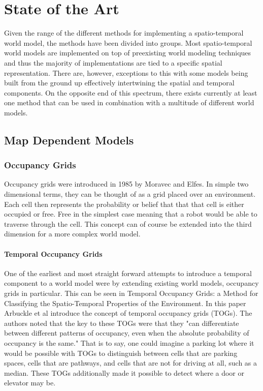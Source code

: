 
\chapter{ State of the Art }

Given the range of the different methods for implementing a spatio-temporal
world model, the methods have been divided into groups.  Most spatio-temporal
world models are implemented on top of preexisting world modeling techniques
and thus the majority of implementations are tied to a specific spatial
representation. There are, however, exceptions to this with some models being
built from the ground up effectively intertwining the spatial and temporal
components. On the opposite end of this spectrum, there exists currently at
least one method that can be used in combination with a multitude of different
world models.


\section{ Map Dependent Models }

\subsection{ Occupancy Grids }

Occupancy grids were introduced in 1985 by Moravec and Elfes. \cite{Elfes1985}
In simple two dimensional terms, they can be thought of as a grid placed
over an environment. Each cell then represents the probability or belief that
that that cell is either occupied or free. Free in the simplest case meaning
that a robot would be able to traverse through the cell. This concept can of
course be extended into the third dimension for a more complex world model. \\

\subsubsection{ Temporal Occupancy Grids }
One of the earliest and most straight forward attempts to introduce a temporal
component to a world model were by extending existing world models, occupancy
grids in particular. This can be seen in Temporal Occupancy Grids: a Method for
Classifying the Spatio-Temporal Properties of the Environment.
\cite{Arbuckle2002} In this paper Arbuckle et al introduce the concept of
temporal occupancy grids (TOGs). The authors noted that the key to these TOGs
were that they "can differentiate between different patterns of occupancy, even
when the absolute probability of occupancy is the same." That is to say, one
could imagine a parking lot where it would be possible with TOGs to distinguish
between cells that are parking spaces, cells that are pathways, and cells that
are not for driving at all, such as a median. These TOGs additionally made it
possible to detect where a door or elevator may be. \\

